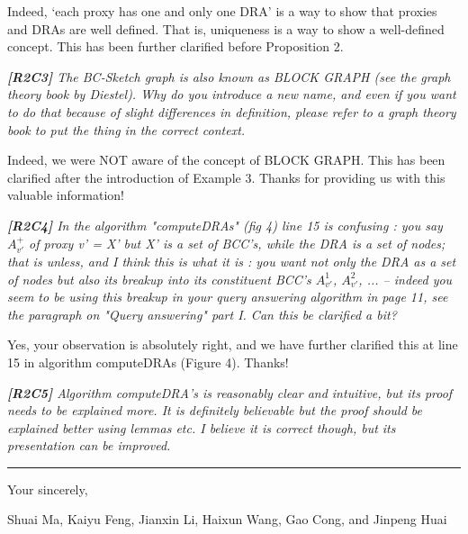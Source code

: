\documentclass[11pt]{letter}
\newcommand{\vs}{\vspace{1ex}}
\newcommand{\svs}{\vspace{0.36ex}}
\begin{document}
Indeed, `each proxy has one and only one DRA' is a way to show that proxies and DRAs are well defined. That is, uniqueness is a way to show a well-defined concept. This has been further clarified before Proposition 2.

\vs
\noindent
{\em
{\bf [R2C3]} The BC-Sketch graph is also known as BLOCK GRAPH (see the graph theory book by Diestel). Why do you introduce a new name, and even if you want to do that because of slight differences in definition, please refer to a graph theory book to put the thing in the correct context.}
\svs

Indeed, we were NOT aware of the concept of BLOCK GRAPH. This has been clarified after the introduction of Example 3. Thanks for providing us with this valuable information!


\vs
\noindent
{\em{\bf[R2C4]}  In the algorithm "computeDRAs" (fig 4) line 15 is confusing : you say $A^+_{v'}$ of proxy v' = X' but X' is a set of BCC's, while the DRA is a set of nodes; that is unless, and I think this is what it is : you want not only the DRA as a set of nodes but also its breakup into its constituent BCC's $A^1_{v'}$, $A^2_{v'}$, ... -- indeed you seem to be using this breakup in your query answering algorithm in page 11, see the paragraph on "Query answering" part I. Can this be clarified a bit?}
\svs

Yes, your observation is absolutely right, and we have further clarified this at line 15 in algorithm computeDRAs (Figure 4). Thanks!


\vs
\noindent
{\em{\bf[R2C5]} Algorithm computeDRA's is reasonably clear and intuitive, but its proof needs to be explained more. It is definitely believable but the proof should be explained better using lemmas etc. I believe it is correct though, but its presentation can be improved.}
\svs



\vspace{3.6ex}
\hrule
\vspace{3.6ex}
\closing{Your sincerely,}

\vspace{-8ex}
Shuai Ma, Kaiyu Feng, Jianxin Li, Haixun Wang, Gao Cong, and Jinpeng Huai
\end{document}
